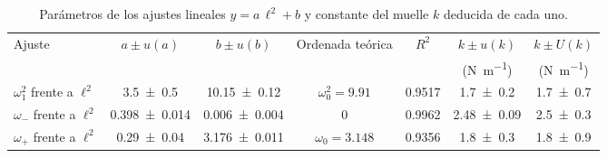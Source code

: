 
\begin{table}[ht]
\centering
\caption{Parámetros de los ajustes lineales $y = a\,\ell^2 + b$ y constante del muelle $k$ deducida de cada uno.}
\label{tab:ajustes_lineales}
\renewcommand{\arraystretch}{1.3}\setlength{\tabcolsep}{4.5pt}\small
\begin{tabular}{@{}l c c c c c c@{}}
\toprule
Ajuste & $a\pm u(a)$ & $b\pm u(b)$ & Ordenada teórica & $R^{2}$ & $k\pm u(k)$ & $k\pm U(k)$ \\
 & & & & & (\si{\newton\per\meter}) & (\si{\newton\per\meter}) \\
\midrule
$\omega_1^{2}$ frente a $\ell^{2}$ & \num{3.5 \pm 0.5} & \num{10.15 \pm 0.12} & $\omega_0^{2}=\num{9.91}$ & \num{0.9517} & \num{1.7 \pm 0.2} & \num{1.7 \pm 0.7} \\
$\omega_{-}$ frente a $\ell^{2}$ & \num{0.398 \pm 0.014} & \num{0.006 \pm 0.004} & $0$ & \num{0.9962} & \num{2.48 \pm 0.09} & \num{2.5 \pm 0.3} \\
$\omega_{+}$ frente a $\ell^{2}$ & \num{0.29 \pm 0.04} & \num{3.176 \pm 0.011} & $\omega_0=\num{3.148}$ & \num{0.9356} & \num{1.8 \pm 0.3} & \num{1.8 \pm 0.9} \\
\bottomrule
\end{tabular}
\par{}
\end{table}
